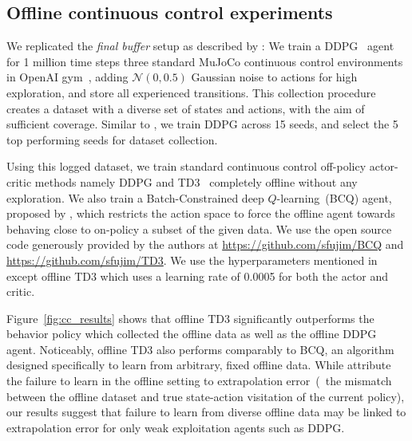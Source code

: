 \subsection{Offline continuous control experiments}\label{sec:offline_cc}
We replicated the \textit{final buffer} setup as described by \citet{fujimoto2018off}: We train a DDPG~\citep{lillicrap2015continuous}
agent for 1 million time steps three standard MuJoCo continuous control environments in OpenAI gym~\citep{todorov2012mujoco, brockman2016openai}, adding $\mathcal{N}(0, 0.5)$
Gaussian noise to actions for high exploration, and store all experienced transitions. This collection procedure creates a dataset with a diverse set of
states and actions, with the aim of sufficient coverage. Similar to \citet{fujimoto2018off}, we train DDPG across 15 seeds,
and select the 5 top performing seeds for dataset collection.

Using this logged dataset, we train standard continuous control off-policy actor-critic methods namely DDPG
and TD3~\citep{fujimoto2018addressing} completely offline without any exploration. We also train a
Batch-Constrained deep $Q$-learning~(BCQ) agent, proposed by \citet{fujimoto2018off}, which restricts the action space
to force the offline agent towards behaving close to on-policy \wrt a subset of the given data.
We use the open source code generously provided by the authors at \url{https://github.com/sfujim/BCQ} and \url{https://github.com/sfujim/TD3}.
We use the hyperparameters mentioned in \citep{fujimoto2018addressing, fujimoto2018off} except offline TD3 which uses a learning rate of
0.0005 for both the actor and critic.

Figure~\ref{fig:cc_results} shows that offline TD3 significantly outperforms the behavior policy which collected the offline data as well as the
offline DDPG agent. Noticeably, offline TD3 also performs comparably to BCQ, an algorithm designed specifically to
learn from arbitrary, fixed offline data. While \citet{fujimoto2018off} attribute the failure to learn in the offline setting to
extrapolation error~(\ie~the mismatch between the offline dataset and true state-action visitation of the current policy),
our results suggest that failure to learn from diverse offline data %
may be linked to extrapolation error for only weak exploitation agents such as DDPG.

